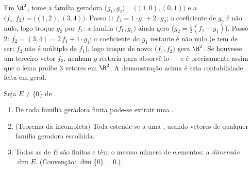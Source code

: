 \begin{example}
\label{ex:b1:findim:exchangerun}
Em $\R^2$, tome a família geradora $\bigl(g_1, g_2\bigr) =
\bigl((1,0), (0,1)\bigr)$ e a  $\bigl(f_1,
f_2\bigr) = \bigl((1,2), (3,4)\bigr)$.
Passo $1$: $f_1 = 1\cdot
g_1 + 2\cdot g_2$; o coeficiente de $g_2$ é não nulo, logo troque
$g_2$ por $f_1$: a família $\bigl(f_1, g_1\bigr)$ ainda gera ($g_2 = \frac12(f_1 - g_1)$). Passo $2$:
$f_2 =
(3,4) = 2\,f_1 + 1\cdot g_1$; o coeficiente do $g_1$ restante é não nulo (e tem de ser:
$f_2$ não é múltiplo de $f_1$), logo troque de novo: $\bigl(f_1, f_2\bigr)$ gera
$\R^2$. Se houvesse um terceiro vetor  $f_3$, nenhum $g$
restaria para absorvê-lo --- e é precisamente assim que o lema
proíbe $3$ vetores  em $\R^2$. A demonstração acima é esta
contabilidade feita em geral.
\end{example}

\begin{theorem}\label{thm:b1:findim:bases}
Seja $E \neq \{0\}$ de .
\begin{enumerate}
  \item De toda família geradora finita pode-se extrair uma .
  \item (Teorema da  incompleta)
        Toda  estende-se a uma , usando vetores de
        qualquer família geradora escolhida.
  \item Todas as  de $E$ são finitas e têm o mesmo número de
        elementos: a \emph{dimensão} $\dim E$. (Convenção:
        $\dim\{0\} = 0$.)
\end{enumerate}
\end{theorem}

